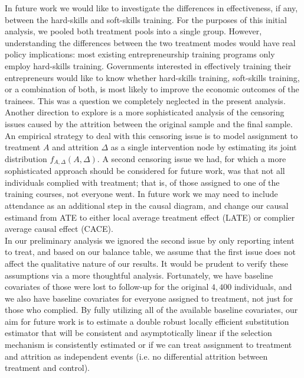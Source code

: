 In future work we would like to investigate the differences in effectiveness, if any, between the hard-skills and soft-skills training. For the purposes of this initial analysis, we pooled both treatment pools into a single group. However, understanding the differences between the two treatment modes would have real policy implications: most existing entrepreneurship training programs only employ hard-skills training. Governments interested in effectively training their entrepreneurs would like to know whether hard-skills training, soft-skills training, or a combination of both, is most likely to improve the economic outcomes of the trainees. This was a question we completely neglected in the present analysis.\\

Another direction to explore is a more sophisticated analysis of the censoring issues caused by the attrition between the original sample and the final sample. An empirical strategy to deal with this censoring issue is to model assignment to treatment $A$ and attrition $\Delta$ as a single intervention node by estimating its joint distribution $f_{A,\Delta}(A,\Delta)$. A second censoring issue we had, for which a more sophisticated approach should be considered for future work, was that not all individuals complied with treatment; that is, of those assigned to one of the training courses, not everyone went. In future work we may need to include attendance as an additional step in the causal diagram, and change our causal estimand from ATE to either local average treatment effect (LATE) or complier average causal effect (CACE).\\

In our preliminary analysis we ignored the second issue by only reporting intent to treat, and based on our balance table, we assume that the first issue does not affect the qualitative nature of our results. It would be prudent to verify these assumptions via a more thoughtful analysis. Fortunately, we have baseline covariates of those were lost to follow-up for the original $4,400$ individuals, and we also have baseline covariates for everyone assigned to treatment, not just for those who complied. By fully utilizing all of the available baseline covariates, our aim for future work is to estimate a double robust locally efficient substitution estimator that will be consistent and asymptotically linear if the selection mechanism is consistently estimated or if we can treat assignment to treatment and attrition as independent events (i.e. no differential attrition between treatment and control).


